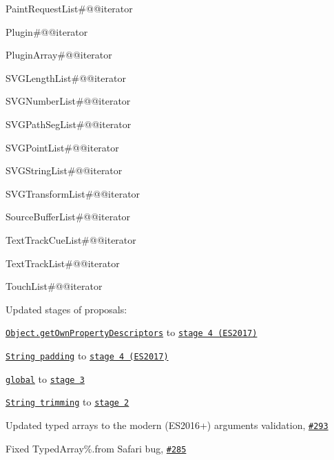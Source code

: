 \begin{DoxyItemize}
\begin{DoxyItemize}
\item {\ttfamily Paint\+Request\+List\#@@iterator}
\item {\ttfamily Plugin\#@@iterator}
\item {\ttfamily Plugin\+Array\#@@iterator}
\item {\ttfamily S\+V\+G\+Length\+List\#@@iterator}
\item {\ttfamily S\+V\+G\+Number\+List\#@@iterator}
\item {\ttfamily S\+V\+G\+Path\+Seg\+List\#@@iterator}
\item {\ttfamily S\+V\+G\+Point\+List\#@@iterator}
\item {\ttfamily S\+V\+G\+String\+List\#@@iterator}
\item {\ttfamily S\+V\+G\+Transform\+List\#@@iterator}
\item {\ttfamily Source\+Buffer\+List\#@@iterator}
\item {\ttfamily Text\+Track\+Cue\+List\#@@iterator}
\item {\ttfamily Text\+Track\+List\#@@iterator}
\item {\ttfamily Touch\+List\#@@iterator}
\end{DoxyItemize}
\item Updated stages of proposals\+:
\begin{DoxyItemize}
\item \href{https://github.com/tc39/proposal-object-getownpropertydescriptors}{\tt {\ttfamily Object.\+get\+Own\+Property\+Descriptors}} to \href{https://tc39.github.io/ecma262/2017/#sec-object.getownpropertydescriptors}{\tt stage 4 (E\+S2017)}
\item \href{https://github.com/tc39/proposal-string-pad-start-end}{\tt String padding} to \href{https://tc39.github.io/ecma262/2017/#sec-string.prototype.padend}{\tt stage 4 (E\+S2017)}
\item \href{https://github.com/tc39/proposal-global}{\tt {\ttfamily global}} to \href{https://github.com/rwaldron/tc39-notes/blob/master/es7/2016-09/sept-28.md#revisit-systemglobal--global}{\tt stage 3}
\item \href{https://github.com/tc39/proposal-string-left-right-trim}{\tt String trimming} to \href{https://github.com/rwaldron/tc39-notes/blob/master/es7/2016-07/jul-27.md#10iic-trimstarttrimend}{\tt stage 2}
\end{DoxyItemize}
\item Updated typed arrays to the modern (E\+S2016+) arguments validation, \href{https://github.com/zloirock/core-js/pull/293}{\tt \#293}
\item Fixed {\ttfamily Typed\+Array\%.from} Safari bug, \href{https://github.com/zloirock/core-js/issues/285}{\tt \#285}

\end{DoxyItemize}

